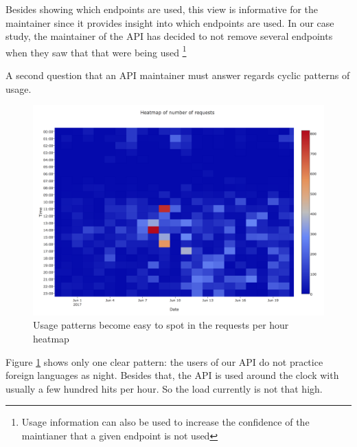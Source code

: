 \documentclass[conference]{IEEEtran}
\begin{document}

  Besides showing which endpoints are used, this view is informative for the maintainer since it provides insight into which endpoints are used. In our case study, the maintainer of the API has decided to not remove several endpoints when they saw that that were being used \footnote{Usage information can also be used to increase the confidence of the maintianer that a given endpoint is not used}

  \niceseparator

  A second question that an API maintainer must answer regards cyclic patterns of usage. 



    \begin{figure}[h!]
      \centering
      \includegraphics[width=\linewidth]{daily_patterns}
      \caption{Usage patterns become easy to spot in the requests per hour heatmap}
      \label{fig:dp}
    \end{figure}


  Figure \ref{fig:dp} shows only one clear pattern: the users of our API do not practice foreign languages as night. Besides that, the API is used around the clock with usually a few hundred hits per hour. So the load currently is not that high. 
\end{document}

